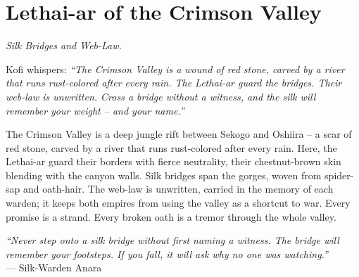 \documentclass[12pt,oneside]{book}
\begin{document}
\chapter{Lethai-ar of the Crimson Valley}
\emph{Silk Bridges and Web-Law.}

\noindent
Kofi whispers: \textit{``The Crimson Valley is a wound of red stone, carved by a river that runs rust-colored after every rain. The Lethai-ar guard the bridges. Their web-law is unwritten. Cross a bridge without a witness, and the silk will remember your weight -- and your name.''}

\noindent
The Crimson Valley is a deep jungle rift between Sekogo and Oshiira -- a scar of red stone, carved by a river that runs rust-colored after every rain. Here, the Lethai-ar guard their borders with fierce neutrality, their chestnut-brown skin blending with the canyon walls. Silk bridges span the gorges, woven from spider-sap and oath-hair. The web-law is unwritten, carried in the memory of each warden; it keeps both empires from using the valley as a shortcut to war. Every promise is a strand. Every broken oath is a tremor through the whole valley.

\vspace{0.5em}
\noindent\textit{``Never step onto a silk bridge without first naming a witness. The bridge will remember your footsteps. If you fall, it will ask why no one was watching.''} \\
--- Silk-Warden Anara
\end{document}
